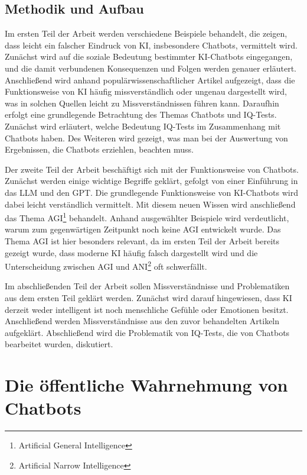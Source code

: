 	\subsection{Methodik und Aufbau} 
	Im ersten Teil der Arbeit werden verschiedene Beispiele behandelt, die zeigen, dass leicht ein falscher 
	Eindruck von KI, insbesondere Chatbots, vermittelt wird. Zunächst wird auf die soziale Bedeutung bestimmter
	KI-Chatbots eingegangen, und die damit verbundenen Konsequenzen und Folgen werden genauer erläutert. Anschließend
	wird anhand populärwissenschaftlicher Artikel aufgezeigt, dass die Funktionsweise von KI häufig missverständlich 
	oder ungenau dargestellt wird, was in solchen Quellen leicht zu Missverständnissen führen kann.
	Daraufhin erfolgt eine grundlegende Betrachtung des Themas Chatbots und IQ-Tests. Zunächst wird erläutert, welche
	Bedeutung IQ-Tests im Zusammenhang mit Chatbots haben. Des Weiteren wird gezeigt, was man bei der Auswertung von 
	Ergebnissen, die Chatbots erziehlen, beachten muss.

	Der zweite Teil der Arbeit beschäftigt sich mit der Funktionsweise von Chatbots. Zunächst werden einige wichtige Begriffe
	geklärt, gefolgt von einer Einführung in das LLM und den GPT. Die grundlegende Funktionsweise von KI-Chatbots wird dabei 
	leicht verständlich vermittelt. Mit diesem neuen Wissen wird anschließend das Thema AGI\footnote{Artificial General Intelligence} behandelt. 
	Anhand ausgewählter Beispiele wird verdeutlicht, warum zum gegenwärtigen Zeitpunkt noch keine AGI entwickelt wurde. Das Thema AGI ist hier 
	besonders relevant, da im ersten Teil der Arbeit bereits gezeigt wurde, dass moderne KI häufig falsch dargestellt wird und die Unterscheidung 
	zwischen AGI und ANI\footnote{Artificial Narrow Intelligence} oft schwerfällt.

	Im abschließenden Teil der Arbeit sollen Missverständnisse und Problematiken aus dem ersten Teil geklärt werden. Zunächst wird 
	darauf hingewiesen, dass KI derzeit weder intelligent ist noch menschliche Gefühle oder Emotionen besitzt. Anschließend werden 
	Missverständnisse aus den zuvor behandelten Artikeln aufgeklärt. Abschließend wird die Problematik von IQ-Tests, die von Chatbots 
	bearbeitet wurden, diskutiert. 	
	
	
\clearpage
\section{Die öffentliche Wahrnehmung von Chatbots}\label{s1}
